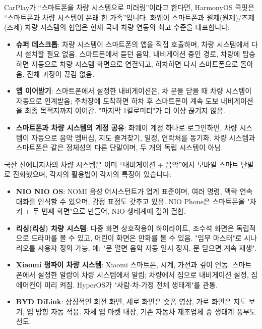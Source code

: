 
CarPlay가 “스마트폰을 차량 시스템으로 미러링”이라고 한다면, HarmonyOS 콕핏은 “스마트폰과 차량 시스템이 본래 한 가족”입니다. 화웨이 스마트폰과 원제(원제)/즈제(즈제) 차량 시스템의 협업은 현재 국내 차량 연동의 최고 수준을 대표합니다:

\begin{itemize}
  \item \textbf{슈퍼 데스크톱}: 차량 시스템이 스마트폰의 앱을 직접 호출하며, 차량 시스템에서 다시 설치할 필요 없음. 스마트폰에서 듣던 음악, 내비게이션 중인 경로, 차량에 탑승하면 자동으로 차량 시스템 화면으로 연결되고, 하차하면 다시 스마트폰으로 돌아옴, 전체 과정이 끊김 없음.
  \item \textbf{앱 이어받기}: 스마트폰에서 설정한 내비게이션은, 차 문을 닫을 때 차량 시스템이 자동으로 인계받음; 주차장에 도착하면 하차 후 스마트폰이 계속 도보 내비게이션을 최종 목적지까지 이어감. "마지막 1킬로미터"가 더 이상 끊기지 않음.
  \item \textbf{스마트폰과 차량 시스템의 계정 공유}: 화웨이 계정 하나로 로그인하면, 차량 시스템이 자동으로 음악 멤버십, 지도 즐겨찾기, 일정, 연락처를 동기화. 차량 시스템과 스마트폰은 같은 정체성의 다른 단말이며, 두 개의 독립 시스템이 아님.
\end{itemize}


국산 신에너지차의 차량 시스템은 이미 “내비게이션 + 음악”에서 모바일 스마트 단말로 진화했으며, 각자의 활용법이 각자의 특징이 있습니다:

\begin{itemize}
  \item \textbf{NIO NIO OS}: NOMI 음성 어시스턴트가 업계 표준이며, 여러 명령, 맥락 연속 대화를 인식할 수 있으며, 감정 표정도 갖추고 있음. NIO Phone은 스마트폰을 "차 키 + 두 번째 화면"으로 만들어, NIO 생태계에 깊이 결합.
  \item \textbf{리싱(리싱) 차량 시스템}: 다중 화면 상호작용이 하이라이트, 조수석 화면은 독립적으로 드라마를 볼 수 있고, 어린이 화면은 만화를 볼 수 있음. "임무 마스터"로 시나리오를 사용자 정의 가능, 예: "문 열면 음악 자동 일시 정지, 문 닫으면 계속 재생".
  \item \textbf{Xiaomi 펑파이 차량 시스템}: Xiaomi 스마트폰, 시계, 가전과 깊이 연동. 스마트폰에서 설정한 알람이 차량 시스템에서 알림; 차량에서 집으로 내비게이션 설정, 집 에어컨이 미리 켜짐. HyperOS가 "사람-차-가정 전체 생태계"를 관통.
  \item \textbf{BYD DiLink}: 상징적인 회전 화면, 세로 화면은 숏폼 영상, 가로 화면은 지도 보기, 앱 방향 자동 적응. 자체 앱 마켓 내장, 기존 자동차 제조업체 중 생태계 풍부도 선도.
\end{itemize}

